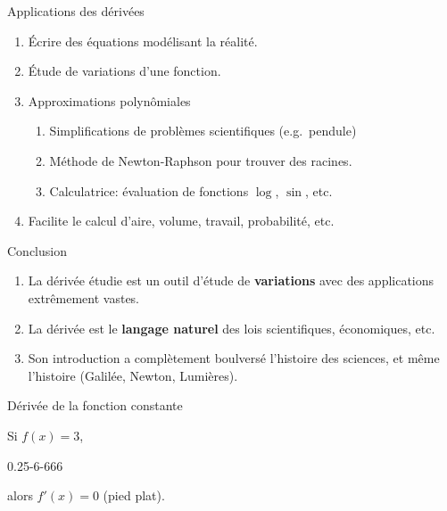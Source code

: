 \documentclass{beamer}
\begin{document}
\begin{frame}
    {Applications des dérivées}

    \begin{enumerate}
        \item Écrire des équations modélisant la réalité.
            \pause{}
        \item Étude de variations d'une fonction.
            \pause{}
        \item Approximations polynômiales
            \begin{enumerate}
                \item Simplifications de problèmes scientifiques (e.g.\ pendule)
                    \pause{}
                \item Méthode de Newton-Raphson pour trouver des racines.
                    \pause{}
                \item Calculatrice: évaluation de fonctions $\log$, $\sin$, etc.
            \end{enumerate}
            \pause{}
        \item Facilite le calcul d'aire, volume, travail, probabilité, etc.\\
    \end{enumerate}
\end{frame}

\begin{frame}
    {Conclusion}

    \begin{enumerate}
        \item La dérivée étudie est un outil d'étude de \textbf{variations} avec des applications extrêmement vastes.
            \pause{}
        \item La dérivée est le \textbf{langage naturel} des lois scientifiques, économiques, etc.
            \pause{}
        \item Son introduction a complètement boulversé l'histoire des sciences, et même l'histoire
            (Galilée, Newton, Lumières).
    \end{enumerate}
\end{frame}

\begin{frame}
    {Dérivée de la fonction constante}

    Si $f(x) = 3$,
    \begin{plot}
        {0.25}{-6}{-6}{6}{6}
    \end{plot}
    \pause{}
    alors $f'(x) = 0$ (pied plat).
\end{frame}
\end{document}
